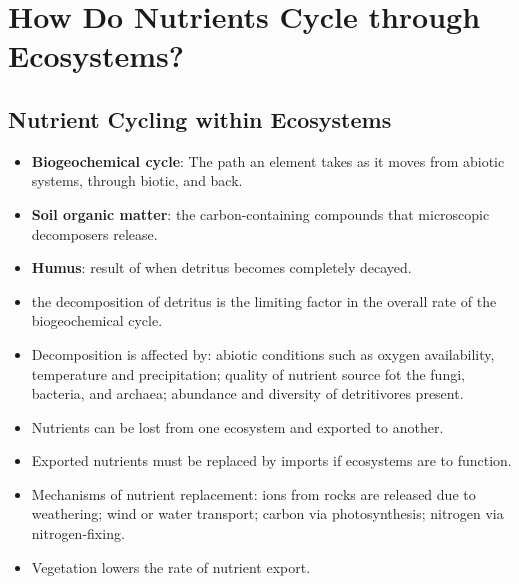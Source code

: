 \documentclass[12pt,a4paper]{article}
\begin{document}
\section{How Do Nutrients Cycle through Ecosystems?}
\subsection{Nutrient Cycling within Ecosystems}
\begin{itemize}
    \item \textbf{Biogeochemical cycle}: The path an element takes as it moves from abiotic systems, through biotic, and back. 
    \item \textbf{Soil organic matter}: the carbon-containing compounds that microscopic decomposers release.
    \item \textbf{Humus}: result of when detritus becomes completely decayed.
    \item the decomposition of detritus is the limiting factor in the overall rate of the biogeochemical cycle.
    \item Decomposition is affected by: abiotic conditions such as oxygen availability, temperature and precipitation; quality of nutrient source fot the fungi, bacteria, and archaea; abundance and diversity of detritivores present.
    \item Nutrients can be lost from one ecosystem and exported to another.
    \item Exported nutrients must be replaced by imports if ecosystems are to function.
    \item Mechanisms of nutrient replacement: ions from rocks are released due to weathering; wind or water transport; carbon via photosynthesis; nitrogen via nitrogen-fixing.
    \item Vegetation lowers the rate of nutrient export.
\end{itemize}
\end{document}
